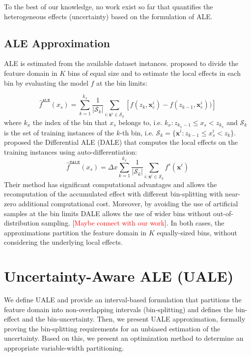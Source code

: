 \documentclass[twoside]{article}
\newcommand{\xc}{\mathbf{x}_c}
\newcommand{\xb}{\mathbf{x}}
\newcommand{\todo}[1]{[\textcolor{red}{#1}]}
\begin{document}
To the best of our knowledge, no work exist so far that quantifies the
heterogeneous effects (uncertainty) based on the formulation of ALE.

\subsection{ALE Approximation}
\label{sec:ale-approximation}

ALE is estimated from the available dataset instances. \citep{apley2020visualizing} proposed to divide the feature
domain in \(K\) bins of equal size and to estimate the local effects
in each bin by evaluating the model \(f\) at the bin limits:

\begin{equation}
  \label{eq:ALE_accumulated_mean_est}
  \hat{f}^{\mathtt{ALE}}(x_s) = \sum_{k=1}^{k_x} \frac{1}{|\mathcal{S}_k|} \sum_{i:\mathbf{x}^i \in
    \mathcal{S}_k} \left [ f(z_{k}, \xc^i) - f(z_{k-1}, \xc^i)) \right ]
\end{equation}
%
where \(k_x\) the index of the bin that \(x_s\) belongs to,
i.e. \(k_x: z_{k_x-1} \leq x_s < z_{k_x} \) and \(\mathcal{S}_k\) is
the set of training instances of the \(k\)-th bin, i.e.
\( \mathcal{S}_k = \{ \xb^i : z_{k-1} \leq x^i_s < z_{k} \}
\). \citep{gkolemis22} proposed the Differential ALE (DALE) that
computes the local effects on the training instances using
auto-differentiation:
\begin{equation}  \label{eq:DALE_accumulated_mean_est}
  \hat{f}^{\mathtt{DALE}}(x_s) = \Delta x \sum_{k=1}^{k_x} \frac{1}{|\mathcal{S}_k|} \sum_{i:\mathbf{x}^i \in
    \mathcal{S}_k} f^s(\mathbf{x}^i)
\end{equation}
%
Their method has significant computational advantages and allows the
recomputation of the accumulated effect with different bin-splitting
with near-zero additional computational cost. Moreover, by avoiding
the use of artificial samples at the bin limits DALE allows the use of
wider bins without out-of-distribution sampling. \todo{Maybe connect with our work}. In both cases, the
approximations partition the feature domain in \(K\) equally-sized
bins, without considering the underlying local effects.


\section{Uncertainty-Aware ALE (UALE)}
\label{sec:UALE}

We define UALE and provide an interval-based formulation that
partitions the feature domain into non-overlapping intervals
(bin-splitting) and defines the bin-effect and the
bin-uncertainty. Then, we present UALE approximation, formally proving
the bin-splitting requirements for an unbiased estimation of the
uncertainty. Based on this, we present an optimization method to
determine an appropriate variable-width partitioning.
\end{document}
